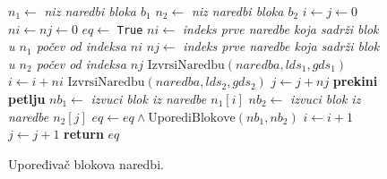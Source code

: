 \begin{figure}[!h]
\begin{algorithmic}[1]
\State $n_1 \gets $ \emph{niz naredbi bloka $b_1$} 
\State $n_2 \gets $ \emph{niz naredbi bloka $b_2$}
\State $i \gets j \gets 0$
\State $ni \gets nj \gets 0$
\State $eq \gets $ \texttt{True}
    \State $ni \gets $ \emph{indeks prve naredbe koja sadrži blok u $n_1$ počev od indeksa $ni$}
    \State $nj \gets $ \emph{indeks prve naredbe koja sadrži blok u $n_2$ počev od indeksa $nj$}
        \State $\text{IzvrsiNaredbu}(naredba, lds_1, gds_1)$
    \EndFor
    \State $i \gets i + ni$
        \State $\text{IzvrsiNaredbu}(naredba, lds_2, gds_2)$
    \EndFor
    \State $j \gets j + nj$
        \State \textbf{prekini petlju}
    \EndIf
    \State $nb_1 \gets $ \emph{izvuci blok iz naredbe $n_1[i]$}
    \State $nb_2 \gets $ \emph{izvuci blok iz naredbe $n_2[j]$}
    \State $eq \gets eq \wedge \text{UporediBlokove}(nb_1, nb_2)$
    \State $i \gets i + 1$
    \State $j \gets j + 1$
\EndWhile
\State \textbf{return} $eq$
\EndProcedure
\end{algorithmic}
\caption{Upoređivač blokova naredbi.}
\label{fig:ComparisonAlgorithmBlocksPseudo1}
\end{figure}

